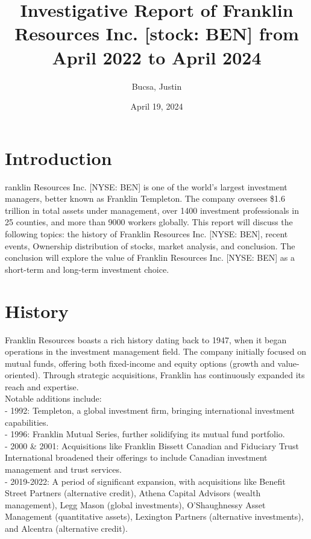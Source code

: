 \documentclass[9pt,a4paper,twoside]{tau}
\title{Investigative Report of Franklin Resources Inc. [stock: BEN] from April 2022 to April 2024}
\author[a,1]{Bucsa, Justin}
\affil[a]{Stealth}
\date{April 19, 2024}
\begin{document}
	
	\maketitle
	\thispagestyle{firststyle}
	\tauabstract
\section{Introduction}

    ranklin Resources Inc. [NYSE: BEN] is one of the world’s largest investment managers, better known as Franklin Templeton. The company oversees \$1.6 trillion in total assets under management, over 1400 investment professionals in 25 counties, and more than 9000 workers globally. This report will discuss the following topics: the history of Franklin Resources Inc. [NYSE: BEN], recent events, Ownership distribution of stocks, market analysis, and conclusion. The conclusion will explore the value of Franklin Resources Inc.
    [NYSE: BEN] as a short-term and long-term investment choice.
    

\section{History}
    
    Franklin Resources boasts a rich history dating back to 1947, when it began operations in the investment management field. The company initially focused on mutual funds, offering both fixed-income and equity options (growth and value-oriented). Through strategic acquisitions, Franklin has continuously expanded its reach and expertise.\\
    Notable additions include: \\
    - 1992: Templeton, a global investment firm, bringing international investment capabilities.\\
    - 1996: Franklin Mutual Series, further solidifying its mutual fund portfolio.\\
    - 2000 \& 2001: Acquisitions like Franklin Bissett Canadian and Fiduciary Trust International broadened their offerings to include Canadian investment management and trust services.\\
    - 2019-2022: A period of significant expansion, with acquisitions like Benefit Street Partners (alternative credit), Athena Capital Advisors (wealth management), Legg Mason (global investments), O’Shaughnessy Asset Management (quantitative assets), Lexington Partners (alternative investments), and Alcentra (alternative credit).\\
    
\end{document}
